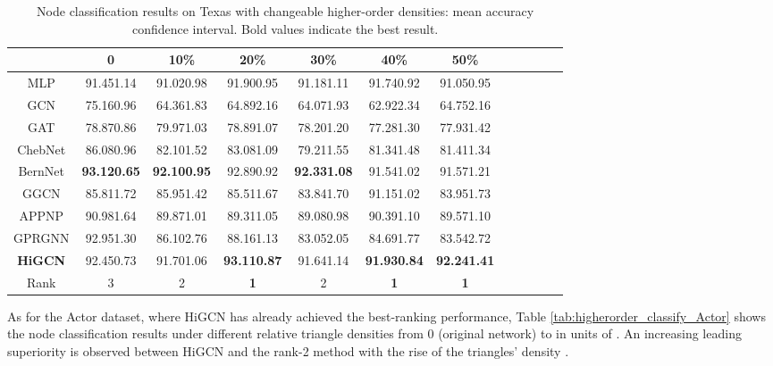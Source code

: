 \documentclass[letterpaper]{article} \usepackage{aaai24}
\newcommand \spm[1] {\footnotesize{#1} }
\theoremstyle{plain}
\theoremstyle{definition}
\theoremstyle{remark}
\begin{document}
\begin{table*}[!ht] 
\centering
\begin{tabular}{cccccccccccc}\toprule
    &0   &10\%   &20\%   &30\%  &40\%  &50\%\\
\midrule
MLP
&91.45\spm{1.14}  &91.02\spm{0.98}  &91.90\spm{0.95}  &91.18\spm{1.11}  &91.74\spm{0.92}  &91.05\spm{0.95}\\
GCN      
&75.16\spm{0.96}  &64.36\spm{1.83}  &64.89\spm{2.16}  &64.07\spm{1.93}  &62.92\spm{2.34}  &64.75\spm{2.16}\\
GAT      
&78.87\spm{0.86}  &79.97\spm{1.03}  &78.89\spm{1.07}  &78.20\spm{1.20}  &77.28\spm{1.30}  &77.93\spm{1.42}\\
ChebNet  
&86.08\spm{0.96}  &82.10\spm{1.52}  &83.08\spm{1.09}  &79.21\spm{1.55}  &81.34\spm{1.48}  &81.41\spm{1.34}\\
BernNet  
&\textbf{93.12\spm{0.65}}  &\textbf{92.10\spm{0.95}}  &92.89\spm{0.92}  &\textbf{92.33\spm{1.08}}  &91.54\spm{1.02}  &91.57\spm{1.21}\\
GGCN  
&85.81\spm{1.72}  &85.95\spm{1.42}  &85.51\spm{1.67}  &83.84\spm{1.70}  &91.15\spm{1.02}  &83.95\spm{1.73}\\
APPNP  
&90.98\spm{1.64}  &89.87\spm{1.01}  &89.31\spm{1.05}  &89.08\spm{0.98}  &90.39\spm{1.10}  &89.57\spm{1.10}\\
GPRGNN 
&92.95\spm{1.30}  &86.10\spm{2.76}  &88.16\spm{1.13}  &83.05\spm{2.05}  &84.69\spm{1.77}  &83.54\spm{2.72}\\
\midrule
\textbf{HiGCN}
&92.45\spm{0.73}  &91.70\spm{1.06}  &\textbf{93.11\spm{0.87}}  &91.64\spm{1.14}  &\textbf{91.93\spm{0.84}} &\textbf{92.24\spm{1.41}}\\
\midrule
Rank
&3  &2  &\textbf{1}  &2  &\textbf{1} &\textbf{1}\\
\bottomrule
\end{tabular}
\caption{Node classification results on Texas with changeable higher-order densities: mean accuracy  confidence interval. Bold values indicate the best result.}
\label{tab:higherorder_classify_Texas}
\end{table*}






As for the Actor dataset, where HiGCN has already achieved the best-ranking performance, Table \ref{tab:higherorder_classify_Actor} shows the node classification results under different relative triangle densities from 0 (original network) to  in units of .
An increasing leading superiority is observed between HiGCN and the rank-2 method with the rise of the triangles' density .
\end{document}
